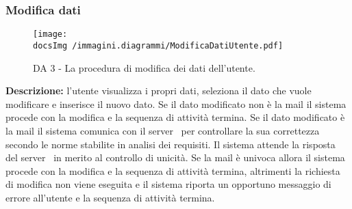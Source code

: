 		\subsubsection{Modifica dati}
		\begin{center}
			\begin{figure}[htbp]
				\centering
				\texttt{[image: \\docsImg /immagini.diagrammi/ModificaDatiUtente.pdf]}
			\caption{DA 3 - La procedura di modifica dei dati dell'utente.}	
			\end{figure}
		\end{center}		
		\noindent \textbf{Descrizione: }l'utente visualizza i propri dati, seleziona il dato che vuole modificare e inserisce il nuovo dato. \newline Se il dato modificato non è la mail il sistema procede con la modifica e la sequenza di attività termina. \newline Se il dato modificato è la mail il sistema comunica con il server\g~ per controllare la sua correttezza secondo le norme stabilite in analisi dei requisiti. Il sistema attende la risposta del server\g~ in merito al controllo di unicità. Se la mail è univoca allora il sistema procede con la modifica e la sequenza di attività termina, altrimenti la richiesta di modifica non viene eseguita e il sistema riporta un opportuno messaggio di errore all'utente e la sequenza di attività termina.
		\newpage
		
		
		
